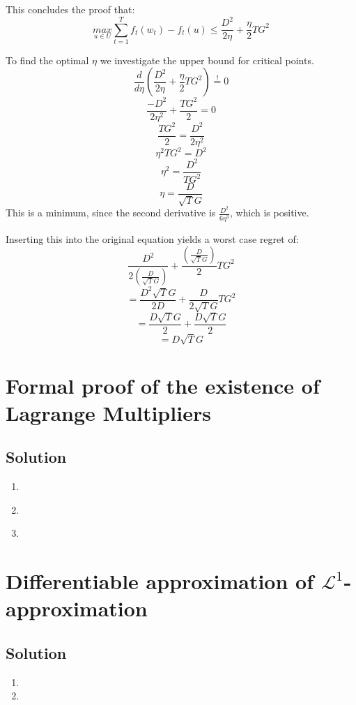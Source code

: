 \documentclass[10pt]{article}
\numberwithin{equation}{section}
\begin{document}
\begin{enumerate}
{This concludes the proof that:
$$\underset{u \in U}{max} \sum_{t=1}^T f_t(w_t) - f_t(u) \leq  \frac{D^2}{2\eta} + \frac{\eta}{2} T G^2$$

\item[d)]{
    To find the optimal $\eta$ we investigate the upper bound for critical points.
    $$ \frac{d}{d \eta} \left( \frac{D^2}{2\eta} + \frac{\eta}{2} T G^2\right)  \overset{!}{=} 0$$
    $$\frac{-D^2}{2\eta^2} + \frac{TG^2}{2} = 0 $$
    $$\frac{TG^2}{2} = \frac{D^2}{2\eta^2}  $$
    $$\eta^2TG^2 = D^2$$
    $$\eta^2 = \frac{D^2}{TG^2}$$
    $$\eta = \frac{D}{\sqrt{T}G}$$
    This is a minimum, since the second derivative is $\frac{D^2}{6\eta^3}$, which is positive.

    Inserting this into the original equation yields a worst case regret of:
    $$\frac{D^2}{2\left(\frac{D}{\sqrt{T}{G}}\right)} + \frac{\left(\frac{D}{\sqrt{T}G}\right)}{2} T G^2$$
    $$=\frac{D^2\sqrt{T}G}{2D} + \frac{D}{2\sqrt{T}G} T G^2$$
    $$=\frac{D\sqrt{T}G}{2} + \frac{D\sqrt{T}G}{2}$$
    $$=D\sqrt{T}G$$
  }
    


}
\end{enumerate}
\section*{Formal proof of the existence of Lagrange Multipliers}

\subsection*{Solution}
\begin{enumerate}
\item[a)]{

}
\item[b)]{
}
\item[c)]{

  }

\end{enumerate}

\section*{Differentiable approximation of $\mathcal{L}^1$-approximation}
\subsection*{Solution}

\begin{enumerate}
\item[a)]{

}
\item[b)]{

}
\end{enumerate}
\end{document}

